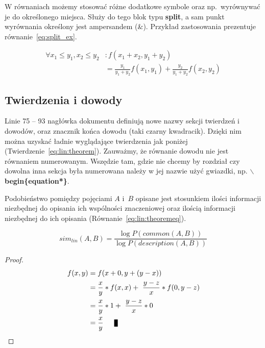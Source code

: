 W równaniach możemy stosować różne dodatkowe symbole oraz np.\ wyrównywać je do określonego miejsca. Służy do tego blok typu \textbf{split}, a sam punkt wyrównania określony jest ampersandem (\&). Przykład zastosowania prezentuje równanie~\ref{eq:split_ex}.

\begin{equation}
  \label{eq:split_ex}
  \begin{split}
    \forall {x_1 \leq y_1, x_2 \leq y_2}&: f(x_1+x_2,y_1+y_2)\\ 
				  &= \frac{y_1}{y_1+y_2}f(x_1,y_1)+\frac{y_2}{y_1+y_2}f(x_2,y_2)
  \end{split}
\end{equation}

\subsection{Twierdzenia i dowody}

Linie 75 -- 93 nagłówka dokumentu definiują nowe nazwy sekcji twierdzeń i dowodów, oraz znacznik końca dowodu (taki czarny kwadracik). Dzięki nim można uzyskać ładnie wyglądające twierdzenia jak poniżej (Twierdzenie~\ref{eq:lin:theorem}). Zauważmy, że równanie dowodu nie jest równaniem numerowanym. Wszędzie tam, gdzie nie chcemy by rozdział czy dowolna inna sekcja była numerowana należy w jej nazwie użyć gwiazdki, np. \textbf{$\backslash$begin\{equation*\}}.

\begin{theorem}
 Podobieństwo pomiędzy pojęciami $A$ i~$B$ opisane jest stosunkiem ilości informacji niezbędnej do opisania ich wspólności znaczeniowej oraz ilością informacji niezbędnej do ich opisania (Równanie~\ref{eq:lin:theoremeq}).

 \begin{equation}
   sim_{lin}(A,B)=\frac{\log P(common(A,B))}{\log P(description(A,B))}
   \label{eq:lin:theoremeq}
 \end{equation}
 \label{eq:lin:theorem}
\end{theorem}

\begin{proof}
  \begin{equation*}
   \begin{split}
     f(x,y)&=f(x+0,y+(y-x))\\
	   &=\frac{x}{y}*f(x,x) +~\frac{y-z}{x}*f(0,y-z)\\
	   &=\frac{x}{y}*1 +~\frac{y-z}{x}*0\\
	   &=\frac{x}{y} \qed
   \end{split}
 \end{equation*}
\end{proof}

